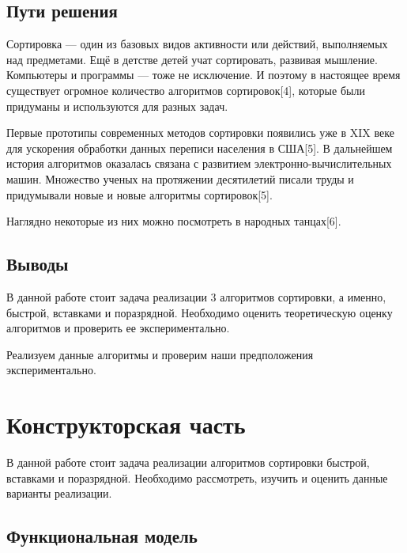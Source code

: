 \documentclass[a4paper,14pt]{article} %
\begin{document}
        \subsection{Пути решения}
        \hfill
        
        Сортировка — один из базовых видов активности или действий, выполняемых над предметами. Ещё в детстве детей учат сортировать, развивая мышление. Компьютеры и программы — тоже не исключение. И поэтому в настоящее время существует огромное количество алгоритмов сортировок[4], которые были придуманы и используются для разных задач. 
        
        \hfill
        
        Первые прототипы современных методов сортировки появились уже в XIX веке для ускорения обработки данных переписи населения в США[5]. В дальнейшем история алгоритмов оказалась связана с развитием электронно-вычислительных машин. Множество ученых на протяжении десятилетий писали труды и придумывали новые и новые алгоритмы сортировок[5].  
        
        Наглядно некоторые из них можно посмотреть в народных танцах[6]. 
        
        	                
        \subsection{Выводы} 
        \hfill
        
        В данной работе стоит задача реализации 3 алгоритмов сортировки, а именно, быстрой, вставками и поразрядной. Необходимо оценить теоретическую оценку алгоритмов и проверить ее экспериментально. 
        
        Реализуем данные алгоритмы и проверим наши предположения экспериментально. 
        
        
	\newpage

	\section{Конструкторская часть}
	\hfill
	
	В данной работе стоит задача реализации алгоритмов сортировки быстрой, вставками и поразрядной. Необходимо рассмотреть, изучить и оценить данные варианты реализации. 
		
	\subsection{Функциональная модель}
		
\end{document}
